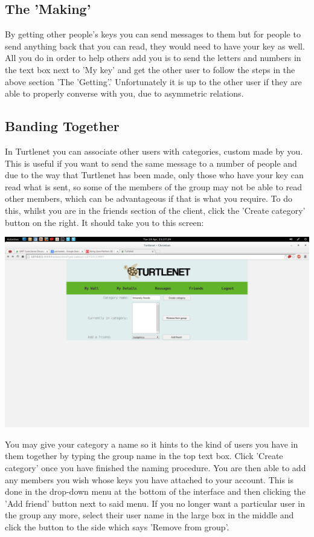 \subsection{The 'Making'}
By getting other people's keys you can send messages to them but for people to
send anything back that you can read, they would need to have your key as well.
All you do in order to help others add you is to send the letters and numbers
in the text box next to 'My key' and get the other user to follow the steps in
the above section 'The 'Getting'.'  Unfortunately it is up to the other user if
they are able to properly converse with you, due to asymmetric relations.

\subsection{Banding Together}
In Turtlenet you can associate other users with categories, custom made by you.
This is useful if you want to send the same message to a number of people and
due to the way that Turtlenet has been made, only those who have your key can
read what is sent, so some of the members of the group may not be able to read
other members, which can be advantageous if that is what you require.
To do this, whilst you are in the friends section of the client, click the 
'Create category' button on the right.  It should take you to this screen:

\includegraphics[scale=0.2]{../Screenshots/new6}

You may give your category a name so it hints to the kind of users you have in
them together by typing the group name in the top text box.  Click 'Create
category' once you have finished the naming procedure.  You are then able to add
any members you wish whose keys you have attached to your account.  This is done
in the drop-down menu at the bottom of the interface and then clicking the 'Add
friend' button next to said menu.  If you no longer want a particular user in
the group any more, select their user name in the large box in the middle and
click the button to the side which says 'Remove from group'.

